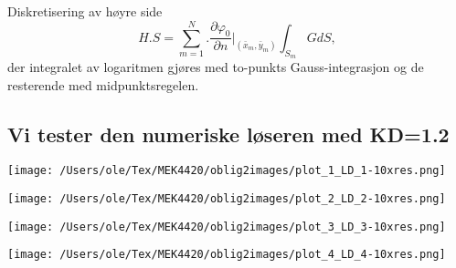 Diskretisering av høyre side
\begin{equation}
	H.S =   \sum_{m=1}^{N} \Big. \frac{\partial \varphi_0}{\partial n} \Big|_{( \bar{x}_{m} , \bar{y}_{m})} \int_{S_m}  G dS,
\end{equation}
der integralet av logaritmen gjøres med to-punkts Gauss-integrasjon og de resterende med midpunktsregelen.

\subsection{Vi tester den numeriske løseren med KD=1.2}
\noindent
\begin{minipage}[t]{0.45\linewidth}
    \texttt{[image: /Users/ole/Tex/MEK4420/oblig2images/plot\_1\_LD\_1-10xres.png]}
\end{minipage}
\hspace{0.05\linewidth}
\begin{minipage}[t]{0.45\linewidth}
    \texttt{[image: /Users/ole/Tex/MEK4420/oblig2images/plot\_2\_LD\_2-10xres.png]}
\end{minipage}

\vspace{0.5cm} %

\noindent
\begin{minipage}[t]{0.45\linewidth}
    \texttt{[image: /Users/ole/Tex/MEK4420/oblig2images/plot\_3\_LD\_3-10xres.png]}
\end{minipage}
\hspace{0.05\linewidth}
\begin{minipage}[t]{0.45\linewidth}
    \texttt{[image: /Users/ole/Tex/MEK4420/oblig2images/plot\_4\_LD\_4-10xres.png]}
\end{minipage}


